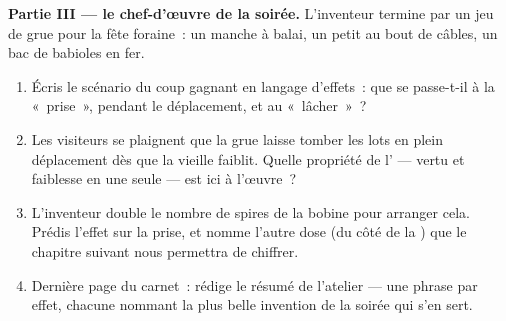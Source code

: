 \begin{problem}
\medskip\noindent\textbf{Partie III --- le chef-d'œuvre de la
soirée.}
L'inventeur termine par un jeu de grue pour la fête foraine~: un
manche à balai, un petit  au bout de câbles, un bac de
babioles en fer.
\begin{enumerate}[resume]
  \item Écris le scénario du coup gagnant en langage d'effets~: que
        se passe-t-il à la «~prise~», pendant le déplacement, et au
        «~lâcher~»~?
  \item Les visiteurs se plaignent que la grue laisse tomber les
        lots en plein déplacement dès que la vieille  faiblit.
        Quelle propriété de l' --- vertu et faiblesse
        en une seule --- est ici à l'œuvre~?
  \item L'inventeur double le nombre de spires de la bobine pour
        arranger cela. Prédis l'effet sur la prise, et nomme
        l'autre dose (du côté de la ) que le chapitre suivant
        nous permettra de chiffrer.
  \item Dernière page du carnet~: rédige le résumé de l'atelier ---
        une phrase par effet, chacune nommant la plus belle
        invention de la soirée qui s'en sert.
\end{enumerate}
\end{problem}
